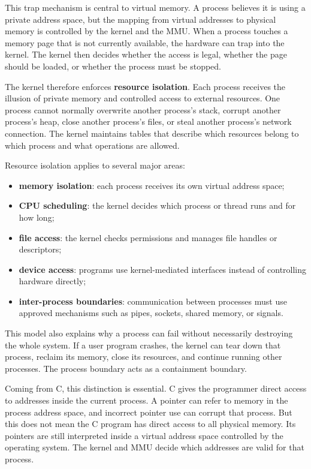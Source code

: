 \documentclass[a4paper,twoside]{report}
\begin{document}
This trap mechanism is central to virtual memory. A process believes it is using a private address space, but the mapping from virtual addresses to physical memory is controlled by the kernel and the MMU. When a process touches a memory page that is not currently available, the hardware can trap into the kernel. The kernel then decides whether the access is legal, whether the page should be loaded, or whether the process must be stopped.

The kernel therefore enforces \textbf{resource isolation}. Each process receives the illusion of private memory and controlled access to external resources. One process cannot normally overwrite another process's stack, corrupt another process's heap, close another process's files, or steal another process's network connection. The kernel maintains tables that describe which resources belong to which process and what operations are allowed.

Resource isolation applies to several major areas:

\begin{itemize}
    \item \textbf{memory isolation}: each process receives its own virtual address space;
    \item \textbf{CPU scheduling}: the kernel decides which process or thread runs and for how long;
    \item \textbf{file access}: the kernel checks permissions and manages file handles or descriptors;
    \item \textbf{device access}: programs use kernel-mediated interfaces instead of controlling hardware directly;
    \item \textbf{inter-process boundaries}: communication between processes must use approved mechanisms such as pipes, sockets, shared memory, or signals.
\end{itemize}

This model also explains why a process can fail without necessarily destroying the whole system. If a user program crashes, the kernel can tear down that process, reclaim its memory, close its resources, and continue running other processes. The process boundary acts as a containment boundary.

Coming from C, this distinction is essential. C gives the programmer direct access to addresses inside the current process. A pointer can refer to memory in the process address space, and incorrect pointer use can corrupt that process. But this does not mean the C program has direct access to all physical memory. Its pointers are still interpreted inside a virtual address space controlled by the operating system. The kernel and MMU decide which addresses are valid for that process.
\end{document}
